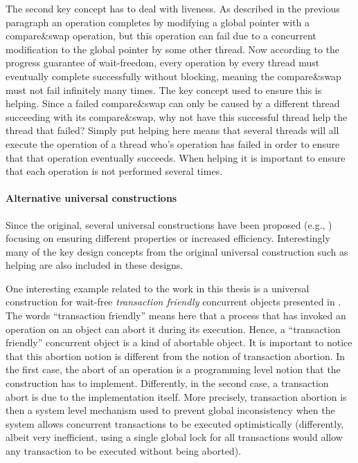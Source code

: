 The second key concept has to deal with liveness.
As described in the previous paragraph an operation completes by
modifying a global pointer with a compare\&swap operation,
but this operation can fail due to a concurrent modification
to the global pointer by some other thread.
Now according to the progress guarantee of wait-freedom, every operation
by every thread must eventually complete successfully without blocking,
meaning the compare\&swap must not fail infinitely many times.
The key concept used to ensure this is helping.
Since a failed compare\&swap can only be caused by a different thread
succeeding with its compare\&swap, why not have this successful
thread help the thread that failed?
Simply put helping here means that several threads will all execute
the operation of a thread who's operation has failed in order to ensure
that that operation eventually succeeds.
When helping it is important to ensure
that each operation is not performed several times.

\paragraph{Alternative universal constructions}
Since the original, several  universal constructions have been proposed
(e.g., \cite{ADT95,AM99,FK09}) focusing on ensuring different properties
or increased efficiency.
Interestingly many of the key design concepts from the original universal construction
such as helping are also included in these designs.

One interesting example related to the work in this thesis is
a universal construction for wait-free {\it transaction friendly} 
concurrent objects presented in \cite{CER10}. The words 
``transaction friendly'' means here that a process that has invoked an
operation on an object can abort it during its execution. Hence, 
a ``transaction friendly'' concurrent object is a kind of  
abortable object.  It is important to notice  that  this  abortion 
notion is different from  the notion of  transaction abortion. 
In the first case, the abort of an operation is a programming level notion
that  the construction has to implement. 
Differently, in the second case,  a transaction abort is  due  to
the implementation itself. More precisely, 
transaction abortion is then a system level mechanism used to  prevent  
global inconsistency when  the system allows concurrent transactions 
to be  executed
optimistically (differently, albeit very inefficient,  using a single 
global lock for  all transactions would allow any  transaction to be executed
without being aborted).

